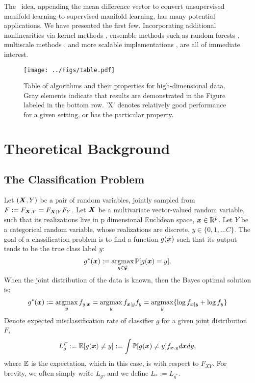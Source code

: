 \documentclass[10pt]{article}
\begin{document}
The \Lol~idea, appending the mean difference vector to convert unsupervised manifold learning to supervised manifold learning, has many potential applications.  We have presented the first few.  Incorporating additional nonlinearities via kernel methods \cite{Mika1999a}, ensemble methods such as random forests \cite{Breiman2001a}, multiscale methods \cite{Allard2012},  and more scalable implementations \cite{Chang2011a}, are all of immediate interest.


\clearpage

\begin{figure}
\centering
\texttt{[image: ../Figs/table.pdf]} %
\caption{Table of algorithms and their properties for high-dimensional data. Gray elements indicate that results are demonstrated in the Figure labeled in the bottom row. 'X' denotes relatively good performance for a given setting, or has the particular property.
}
\label{fig:table}
\end{figure}







\clearpage
\appendix
\section{Theoretical Background}


\subsection{The Classification Problem}

Let $(\boldsymbol{X},Y)$ be a pair of random variables, jointly sampled from $F :=F_{\boldsymbol{X},Y}=F_{\boldsymbol{X}|Y}F_{Y}$.  
Let $\boldsymbol{X}$ be a multivariate vector-valued random variable, such that its realizations live in p dimensional Euclidean space, $\boldsymbol{x} \in \mathbb{R}^p$.  Let $Y$ be a categorical random variable, whose realizations are discrete,  $y \in \{0,1,\ldots C\}$.  The goal of a classification problem is to find a function $g(\boldsymbol{x})$ such that its output tends to be the true class label $y$:
\begin{align*} %
g^*(\bx) := \argmax_{g \in \mc{G}} \PP[g(\bx) = y].
\end{align*}
When the joint distribution of the data is known, then the Bayes optimal solution is:
\begin{align}  \label{eq:R}
g^*(\bx) := \argmax_y f_{y|\bx} = \argmax_y f_{\bx|y}f_y =\argmax_y \{\log f_{\bx|y} + \log f_y \}
\end{align}
Denote expected misclassification rate of classifier $g$ for a given joint distribution $F$, 
\begin{align*}
L^F_g := \mathbb{E}[g(\boldsymbol{x}) \neq y] := \int \mathbb{P}[g(\boldsymbol{x}) \neq y] f_{\boldsymbol{x},y} d\boldsymbol{x} dy,
\end{align*}
where $\mathbb{E}$ is the expectation, which in this case, is with respect to $F_{XY}$.
For brevity, we often simply write $L_g$, and we define $L_* := L_{g^*}$.  
\end{document}
